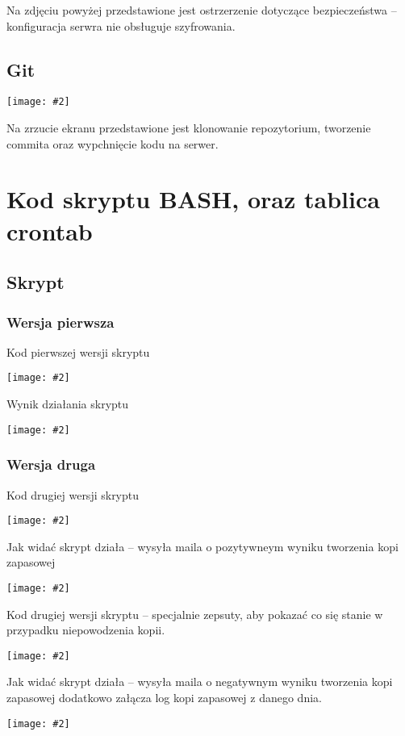 \documentclass[a4paper]{article}
\newcommand*{\zdj}[2][\textwidth]{\texttt{[image: \#2]}}
\newcommand*{\fg}[4][!htb]{
      \begin{figure*}[#1]
            \zdj{#2}
            \caption[#4]{#3}
      \end{figure*}
}
\newcommand*{\fgc}[5][!htb]{
      \begin{figure*}[#1]
            \phantomsection\label{fig:#5}
            \zdj{#2}
            \caption[#4]{#3}
      \end{figure*}
}
\begin{document}
\newpage
Na zdjęciu powyżej przedstawione jest ostrzerzenie dotyczące bezpieczeństwa – konfiguracja serwra nie obsługuje szyfrowania.  
\subsection{Git}
\fgc{contents/configuration/git/3.png}{git – konfiguracja}{git – konfiguracja}{git-test}
Na zrzucie ekranu przedstawione jest klonowanie repozytorium, tworzenie commita oraz wypchnięcie kodu na serwer.

\newpage
\section{Kod skryptu BASH, oraz tablica crontab}
\subsection{Skrypt}

\subsubsection{Wersja pierwsza}
Kod pierwszej wersji skryptu
\fg{contents/configuration/skrypt/4.png}{Kod skryptu – pierwsza wersja}{Kod skryptu – pierwsza wersja}

Wynik działania skryptu
\fg{contents/configuration/skrypt/6.png}{Dzianie skryptu – pierwsza wersja}{Dzianie skryptu – pierwsza wersja}

\newpage
\subsubsection{Wersja druga}
Kod drugiej wersji skryptu
\fg{contents/configuration/skrypt/8.png}{Kod skryptu – druga wersja}{Kod skryptu – druga wersja}

Jak widać skrypt działa – wysyła maila o pozytywneym wyniku tworzenia kopi zapasowej
\fg{contents/configuration/skrypt/9.png}{Dzianie skryptu – druga wersja część 1}{Dzianie skryptu – druga wersja część 1}

\newpage
Kod drugiej wersji skryptu – specjalnie zepsuty, aby pokazać co się stanie w przypadku niepowodzenia kopii.
\fg{contents/configuration/skrypt/10.png}{Kod skryptu – druga wersja (zepsuty)}{Kod skryptu – druga wersja (zepsuty)}

Jak widać skrypt działa – wysyła maila o negatywnym wyniku tworzenia kopi zapasowej dodatkowo załącza log kopi zapasowej z danego dnia.
\fg{contents/configuration/skrypt/11.png}{Dzianie skryptu – druga wersja część 2}{Dzianie skryptu – druga wersja część 2}
\end{document}
